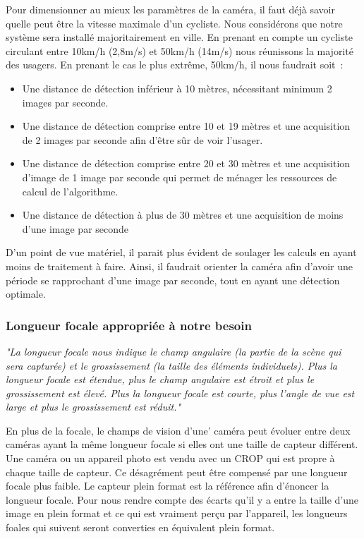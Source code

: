 Pour dimensionner au mieux les paramètres de la caméra, il faut déjà savoir quelle peut être la vitesse maximale d’un cycliste. 
Nous considérons que notre système sera installé majoritairement en ville. 
En prenant en compte un cycliste circulant entre 10km/h (2,8m/s) et 50km/h (14m/s) nous réunissons la majorité des usagers. 
En prenant le cas le plus extrême, 50km/h, il nous faudrait soit :
\begin{itemize}
    \item Une distance de détection inférieur à 10 mètres, nécessitant minimum 2 images par seconde.
    \item Une distance de détection comprise entre 10 et 19 mètres et une acquisition de 2 images par seconde afin 
    d’être sûr de voir l’usager.
    \item Une distance de détection comprise entre 20 et 30 mètres et une acquisition d’image de 1 image par seconde qui permet 
    de ménager les ressources de calcul de l’algorithme.
    \item Une distance de détection à plus de 30 mètres et une acquisition de moins d'une image par seconde
\end{itemize}
D'un point de vue matériel, il parait plus évident de soulager les calculs en ayant moins de traitement à faire. 
Ainsi, il faudrait orienter la caméra afin d'avoir une période se rapprochant d'une image par seconde, tout en ayant une détection optimale.

\subsubsection{Longueur focale appropriée à notre besoin}
\label{sec:camera_focale}

\textit{"La longueur focale nous indique le champ angulaire (la partie de la scène qui sera capturée) 
et le grossissement (la taille des éléments individuels). 
Plus la longueur focale est étendue, plus le champ angulaire est étroit et plus le grossissement est élevé. 
Plus la longueur focale est courte, plus l’angle de vue est large et plus le grossissement est réduit."} \cite{focale}

En plus de la focale, le champs de vision d'une' caméra peut évoluer entre deux caméras ayant la même longueur focale 
si elles ont une taille de capteur différent.
Une caméra ou un appareil photo est vendu avec un \gls{CROP} qui est propre à chaque taille de capteur. 
Ce désagrément peut être compensé par une longueur focale plus faible. 
Le capteur plein format est la référence afin d'énoncer la longueur focale.
Pour nous rendre compte des écarts qu'il y a entre la taille d'une image en plein format et ce qui est vraiment perçu par l'appareil,
les longueurs foales qui suivent seront converties en équivalent plein format.

